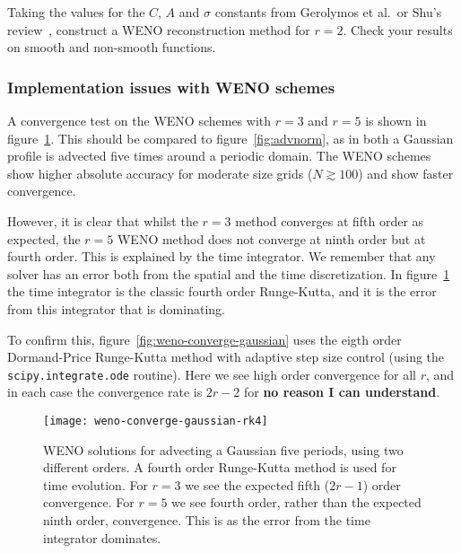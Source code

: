 \begin{exercise}
{Taking the values for the $C$, $A$ and $\sigma$ constants from Gerolymos et
al.\ or Shu's review~\cite{Shu1997}, construct a WENO reconstruction method for
$r=2$. Check your results on smooth and non-smooth functions.}
\end{exercise}

\subsubsection{Implementation issues with WENO schemes}
\label{sec:weno-implementation}

A convergence test on the WENO schemes with $r=3$ and $r=5$ is shown in
figure~\ref{fig:weno-converge-gaussian-rk4}. This should be compared to
figure~\ref{fig:advnorm}, as in both a Gaussian profile is advected five
times around a periodic domain. The WENO schemes show higher absolute accuracy
for moderate size grids ($N \gtrsim 100$) and show faster convergence.

However, it is clear that whilst the $r=3$ method converges at fifth order as
expected, the $r=5$ WENO method does not converge at ninth order but at fourth
order. This is explained by the time integrator. We remember that any solver
has an error both from the spatial and the time discretization. In
figure~\ref{fig:weno-converge-gaussian-rk4} the time integrator is the classic
fourth order Runge-Kutta, and it is the error from this integrator that is
dominating.

To confirm this, figure~\ref{fig:weno-converge-gaussian} uses the eigth order
Dormand-Price Runge-Kutta method with adaptive step size control (using the
\texttt{scipy.integrate.ode} routine). Here we see high order convergence for
all $r$, and in each case the convergence rate is $2 r - 2$ for \textbf{no
reason I can understand}.

\begin{figure}[t]
\centering
\texttt{[image: weno-converge-gaussian-rk4]}
\caption[High order WENO convergence rates for linear advection]
{\label{fig:weno-converge-gaussian-rk4} WENO solutions for advecting a Gaussian five periods, using two different orders. A fourth order Runge-Kutta method is used for time evolution. For $r=3$ we see the expected fifth ($2 r - 1$) order convergence. For $r=5$ we see fourth order, rather than the expected ninth order, convergence. This is as the error from the time integrator dominates. \\
}
\end{figure}
%

